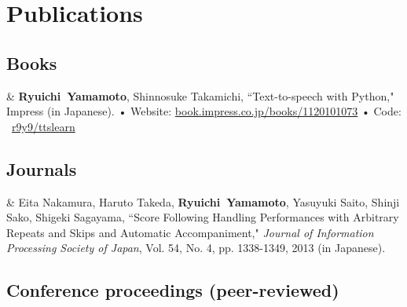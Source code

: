 \documentclass[10pt,a4paper]{article}
\newcommand{\FirstName}{Ryuichi}
\newcommand{\LastName}{Yamamoto}
\newcommand{\MyName}{\FirstName\ \LastName}
\newcommand{\GitHub}[1]{\newline • Code: \faGithub\ \href{https://github.com/#1}{#1}}
\newcommand{\Website}[1]{\newline • Website: \href{https://#1}{#1}}
\newcommand{\Year}[1]{\fontsize{10pt}{0}\selectfont #1}
\begin{document}
\section{Publications}


\subsection{Books}


\begin{EntriesTable}
\Year{2021}  &
  \textbf{\MyName}, Shinnosuke Takamichi,
  ``Text-to-speech with Python," Impress (in Japanese).
  \Website{book.impress.co.jp/books/1120101073}
  \GitHub{r9y9/ttslearn}
\end{EntriesTable}

\subsection{Journals}

\begin{EntriesTable}
\Year{2013}  &
  Eita Nakamura, Haruto Takeda, \textbf{\MyName}, Yasuyuki Saito, Shinji Sako, Shigeki Sagayama,
  ``Score Following Handling Performances with Arbitrary Repeats and Skips and Automatic Accompaniment,"
  \emph{Journal of Information Processing Society of Japan}, Vol. 54, No. 4, pp. 1338-1349, 2013 (in Japanese).
\end{EntriesTable}


\subsection{Conference proceedings (peer-reviewed)}
\end{document}
